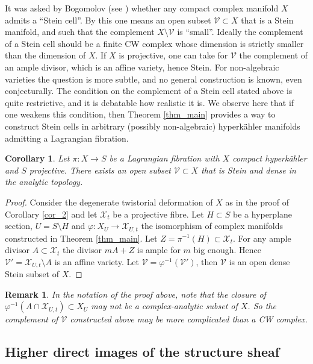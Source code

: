 \documentclass[10pt]{amsart}
\newcommand{\VV}{\mathcal{V}}
\newcommand{\XX}{\mathcal{X}}
\newtheorem{cor}[defn]{Corollary}
\newtheorem{rem}[defn]{Remark}
\begin{document}
It was asked by Bogomolov (see \cite{B2}) whether any compact complex manifold $X$
admits a ``Stein cell''. By this one means an open subset $\VV\subset X$ that is
a Stein manifold, and such that the complement $X\setminus \VV$ is ``small''.
Ideally the complement of a Stein cell should be a finite CW complex whose dimension
is strictly smaller than the dimension of $X$. If $X$ is projective, one can
take for $\VV$ the complement of an ample divisor, which is an affine variety, hence Stein.
For non-algebraic varieties the question is more subtle, and no general construction
is known, even conjecturally. The condition on the complement of a Stein cell stated above
is quite restrictive, and it is debatable how realistic it is. We observe here that if one weakens
this condition, then Theorem \ref{thm_main} provides a way to construct Stein
cells in arbitrary (possibly non-algebraic) hyperk\"ahler manifolds admitting
a Lagrangian fibration.

\begin{cor}\label{cor_Stein}
Let $\pi\colon X\to S$ be a Lagrangian fibration with $X$ compact hyperk\"ahler
and $S$ projective. There exists an open subset $\VV\subset X$ that is Stein and
dense in the analytic topology.
\end{cor}
\begin{proof}
Consider the degenerate twistorial deformation of $X$ as in the proof of Corollary \ref{cor_2}
and let $\XX_t$ be a projective fibre. Let $H\subset S$ be a hyperplane section,
$U = S\setminus H$ and $\varphi\colon X_U\to \XX_{U,t}$ the isomorphism of complex manifolds
constructed in Theorem \ref{thm_main}. Let $Z = \pi^{-1}(H)\subset \XX_t$. For any ample
divisor $A\subset \XX_t$ the divisor $mA+Z$ is ample for $m$ big enough. Hence
$\VV' = \XX_{U,t}\setminus A$ is an affine variety. Let $\VV = \varphi^{-1}(\VV')$, then
$\VV$ is an open dense Stein subset of $X$.
\end{proof}

\begin{rem}
In the notation of the proof above, note that the closure of $\varphi^{-1}(A\cap \XX_{U,t})\subset X_U$
may not be a complex-analytic subset of $X$. So the complement of $\VV$ constructed above
may be more complicated than a CW complex.
\end{rem}

\subsection{Higher direct images of the structure sheaf}
\end{document}
